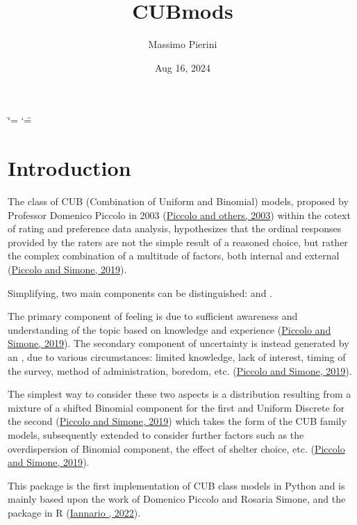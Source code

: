\documentclass[letterpaper,10pt,english]{sphinxmanual}
\title{CUBmods}
\date{Aug 16, 2024}
\author{Massimo Pierini}
\begin{document}
\ifdefined\shorthandoff
  \ifnum\catcode`\=\string=\active\shorthandoff{=}\fi
  \ifnum\catcode`\"=\active{}\fi
\fi

\pagestyle{empty}
\sphinxmaketitle
\pagestyle{plain}
\sphinxtableofcontents
\pagestyle{normal}
\label{\detokenize{index::doc}}


\sphinxstepscope


\chapter{Introduction}
\label{\detokenize{intro:introduction}}\label{\detokenize{intro::doc}}
\sphinxAtStartPar
The class of CUB (Combination of Uniform and Binomial) models, proposed by Professor Domenico Piccolo in
2003 (\hyperlink{cite.intro:id17}{Piccolo and others, 2003}) within the cotext of rating and preference data analysis, hypothesizes that
the ordinal responses provided by the raters are not the simple result of a reasoned choice, but rather the
complex combination of a multitude of factors, both internal and external (\hyperlink{cite.intro:id16}{Piccolo and Simone, 2019}).

\sphinxAtStartPar
Simplifying, two main components can be distinguished:
 and .

\sphinxAtStartPar
The primary component of feeling
is due to sufficient awareness and understanding of the topic based on
knowledge and experience (\hyperlink{cite.intro:id16}{Piccolo and Simone, 2019}).
The secondary component of uncertainty is instead generated by an , due to
various circumstances: limited knowledge, lack of interest, timing of the survey, method of
administration, boredom, etc. (\hyperlink{cite.intro:id16}{Piccolo and Simone, 2019}).

\sphinxAtStartPar
The simplest way to consider these
two aspects is a distribution resulting from a
mixture of a shifted Binomial component for the first and Uniform Discrete for the
second (\hyperlink{cite.intro:id16}{Piccolo and Simone, 2019}) which takes the form of the CUB family models, subsequently
extended to consider further factors such as the overdispersion of
Binomial component, the effect of shelter choice, etc. (\hyperlink{cite.intro:id16}{Piccolo and Simone, 2019}).

\sphinxAtStartPar
This package is the first implementation of CUB class models in Python and is mainly based upon
the work of Domenico Piccolo and Rosaria Simone, and the  package in R (\hyperlink{cite.intro:id31}{Iannario , 2022}).
\end{document}
